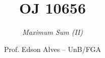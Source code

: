 \title{OJ 10656}
\subtitle{\textit{Maximum Sum (II)}}
\author{Prof. Edson Alves -- UnB/FGA}
\date{}

